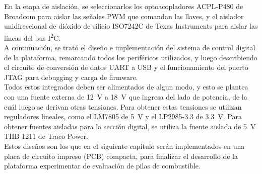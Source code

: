 En la etapa de aislación, se seleccionarlos los optoacopladores {\Medium ACPL-P480 de Broadcom} para aislar las señales PWM que comandan las llaves, y el aislador unidireccional de dióxido de silicio {\Medium ISO7242C de Texas Instruments} para aislar las líneas del bus I\textsuperscript{2}C.\\

A continuación, se trató el diseño e implementación del sistema de control digital de la plataforma, remarcando todos los periféricos utilizados, y luego describiendo el circuito de conversión de datos UART a USB y el funcionamiento del puerto JTAG para debugging y carga de firmware.\\

Todos estos integrados deben ser alimentados de algun modo, y esto se plantea con una fuente externa de \SI[]{12}{\volt} a \SI[]{18}{\volt} que ingresa del lado de potencia, de la cuál luego se derivan otras tensiones. Para obtener estas tensiones se utilizan reguladores lineales, como el {\Medium LM7805} de \SI{5}{\volt} y el {\Medium LP2985-3.3} de \SI[]{3.3}{\volt}. Para obtener fuentes aisladas para la sección digital, se utiliza la fuente aislada de \SI[]{5}{\volt} {\Medium THB-1211 de Traco Power}.\\

Estos diseños son los que en el siguiente capítulo serán implementados en una placa de circuito impreso (PCB) compacta, para finalizar el desarrollo de la plataforma experimentar de evaluación de pilas de combustible.\\